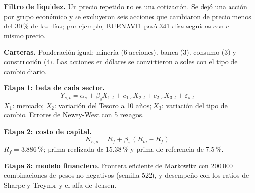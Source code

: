 \documentclass{article}
\newcommand{\cardtitlesize}{\fontsize{24.8}{29.8}\selectfont}
\newcommand{\smallsize}{\fontsize{17.2}{22.4}\selectfont}
\newcommand{\cardtitle}[2][navy]{{\color{#1}\cardtitlesize\bfseries\textls[110]{\MakeUppercase{#2}}}\par\vspace{7mm}}
\begin{document}
\vfill
\hspace*{34mm}\begin{minipage}{773mm}
\begin{tcolorbox}[card]\cardtitle{Metodología}
\begin{minipage}[t]{0.47\linewidth}
{\color{navy}\bfseries Filtro de liquidez.} Un precio repetido no es una cotización. Se dejó una acción por grupo económico y se excluyeron seis acciones que cambiaron de precio menos del 30\,\% de los días; por ejemplo, BUENAVI1 pasó 341 días seguidos con el mismo precio.\par\vspace{6mm}
{\color{navy}\bfseries Carteras.} Ponderación igual: minería (6 acciones), banca (3), consumo (3) y construcción (4). Las acciones en dólares se convirtieron a soles con el tipo de cambio diario.
\end{minipage}\hfill
\begin{minipage}[t]{0.49\linewidth}
{\color{navy}\bfseries Etapa 1: beta de cada sector.}
\[ Y_{s,t} = \alpha_s + \beta_s X_{1,t} + c_{1,s} X_{2,t} + c_{2,s} X_{3,t} + \varepsilon_{s,t} \]
{\smallsize $X_1$: mercado; $X_2$: variación del Tesoro a 10 años; $X_3$: variación del tipo de cambio. Errores de Newey-West con 5 rezagos.}\par\vspace{6mm}
{\color{navy}\bfseries Etapa 2: costo de capital.}
\[ K_{e,s} = R_f + \beta_s\,(R_m - R_f) \]
{\smallsize $R_f = 3.886\,\%$; prima realizada de 15.38\,\% y prima de referencia de 7.5\,\%.}\par\vspace{6mm}
{\color{navy}\bfseries Etapa 3: modelo financiero.} Frontera eficiente de Markowitz con 200\,000 combinaciones de pesos no negativos (semilla 522), y desempeño con los ratios de Sharpe y Treynor y el alfa de Jensen.
\end{minipage}
\end{tcolorbox}
\end{minipage}
\end{document}
